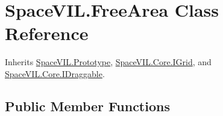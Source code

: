 \hypertarget{class_space_v_i_l_1_1_free_area}{}\section{Space\+V\+I\+L.\+Free\+Area Class Reference}
\label{class_space_v_i_l_1_1_free_area}


Inherits \mbox{\hyperlink{class_space_v_i_l_1_1_prototype}{Space\+V\+I\+L.\+Prototype}}, \mbox{\hyperlink{interface_space_v_i_l_1_1_core_1_1_i_grid}{Space\+V\+I\+L.\+Core.\+I\+Grid}}, and \mbox{\hyperlink{interface_space_v_i_l_1_1_core_1_1_i_draggable}{Space\+V\+I\+L.\+Core.\+I\+Draggable}}.

\subsection*{Public Member Functions}
